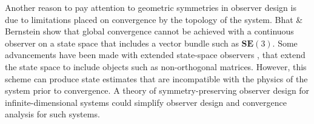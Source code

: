 Another reason to pay attention to geometric symmetries in observer design is due to limitations placed on convergence by the topology of the system. Bhat \& Bernstein \cite{bhat2000topological} show that global convergence cannot be achieved with a continuous observer on a state space that includes a vector bundle such as $\mathbf{SE}(3)$. Some advancements have been made with extended state-space observers \cite{huang2000analysis,talole2010extended}, that extend the state space to include objects such as non-orthogonal matrices. However, this scheme can produce state estimates that are incompatible with the physics of the system prior to convergence. A theory of symmetry-preserving observer design for infinite-dimensional systems could simplify observer design and convergence analysis for such systems.

